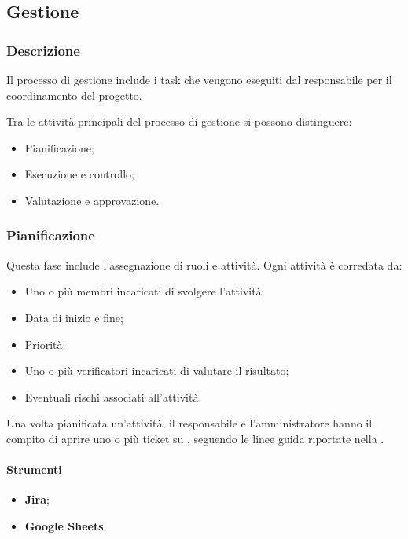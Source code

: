 \subsection{Gestione}

\subsubsection{Descrizione}
\par Il processo di gestione include i task che vengono eseguiti dal responsabile per il coordinamento del progetto.
\par Tra le attività principali del processo di gestione si possono distinguere:
\begin{itemize}
  \item Pianificazione;
  \item Esecuzione e controllo;
  \item Valutazione e approvazione.
\end{itemize}

\subsubsection{Pianificazione}
\par Questa fase include l'assegnazione di ruoli e attività. Ogni attività è corredata da:
\begin{itemize}
  \item Uno o più membri incaricati di svolgere l'attività;
  \item Data di inizio e fine;
  \item Priorità;
  \item Uno o più verificatori incaricati di valutare il risultato;
  \item Eventuali rischi associati all'attività.
\end{itemize}

\vspace{0.5\baselineskip}
\par Una volta pianificata un'attività, il responsabile e l'amministratore hanno il compito di aprire uno o più ticket su , seguendo le linee guida riportate nella .

\paragraph*{Strumenti}
\IntroStrumenti
\begin{itemize}
  \item \textbf{Jira};
  \item \textbf{Google Sheets}.
\end{itemize}

